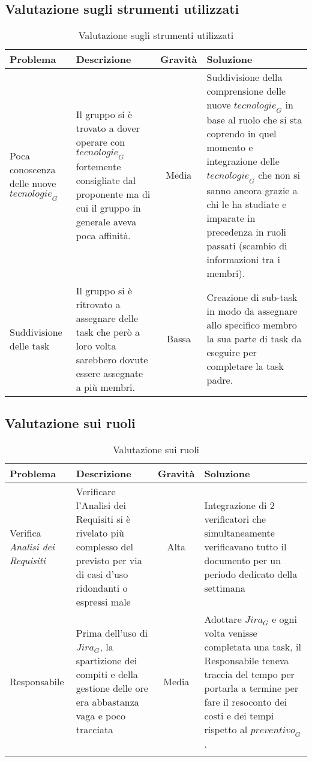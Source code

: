 \subsection{Valutazione sugli strumenti utilizzati}
\begin{table}[h]
\centering
\begin{tabular}{|p{3cm}|p{4cm}|c|p{5cm}|}
\hline
\rowcolor{gray!30}
\textbf{Problema} & \textbf{Descrizione} & \textbf{Gravità} & \textbf{Soluzione}\\
\hline
Poca conoscenza delle nuove $\textit{tecnologie}_G$ & 
Il gruppo si è trovato a dover operare con $\textit{tecnologie}_G$ fortemente consigliate dal proponente ma di cui il gruppo in generale aveva poca affinità. & 
Media & 
Suddivisione della comprensione delle nuove $\textit{tecnologie}_G$ in base al ruolo che si sta coprendo in quel momento e integrazione delle $\textit{tecnologie}_G$ che non si sanno ancora grazie a chi le ha studiate e imparate in precedenza in ruoli passati (scambio di informazioni tra i membri). \\
\hline
Suddivisione delle task &
Il gruppo si è ritrovato a assegnare delle task che però a loro volta sarebbero dovute essere assegnate a più membri. &
Bassa &
Creazione di sub-task in modo da assegnare allo specifico membro la sua parte di task da eseguire per completare la task padre.\\
\hline
\end{tabular}
\caption{Valutazione sugli strumenti utilizzati }
\end{table}



\subsection{Valutazione sui ruoli}
\begin{longtable}[h]{|p{3cm}|p{4cm}|c|p{5cm}|}
\hline
\rowcolor{gray!30}
\textbf{Problema} & \textbf{Descrizione} & \textbf{Gravità} & \textbf{Soluzione}\\
\hline
Verifica \emph{Analisi dei Requisiti} &
Verificare l'Analisi dei Requisiti si è rivelato più complesso del previsto per via di casi d'uso ridondanti o espressi male &
Alta &
Integrazione di 2 verificatori che simultaneamente verificavano tutto il documento per un periodo dedicato della settimana
\\
\hline
Responsabile & 
Prima dell'uso di $\textit{Jira}_G$, la spartizione dei compiti e della gestione delle ore era abbastanza vaga e poco tracciata &
Media &
Adottare $\textit{Jira}_G$ e ogni volta venisse completata una task, il Responsabile teneva traccia del tempo per portarla a termine per fare il resoconto dei costi e dei tempi rispetto al $\textit{preventivo}_G$.
\\
\hline
\caption{Valutazione sui ruoli}
\end{longtable}